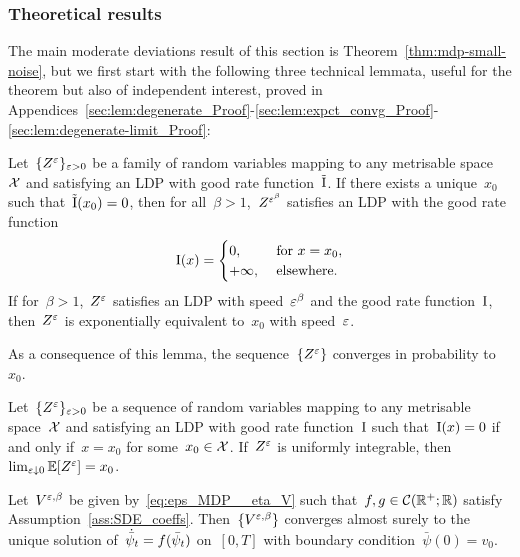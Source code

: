 \subsubsection{Theoretical results}
The main moderate deviations result of this section is Theorem~\ref{thm:mdp-small-noise}, 
but we first start with the following three technical lemmata,
useful for the theorem but also of independent interest, proved in Appendices~\ref{sec:lem:degenerate_Proof}-\ref{sec:lem:expct_convg_Proof}-\ref{sec:lem:degenerate-limit_Proof}:
\begin{lemma}\label{lem:degenerate}
Let~$\{Z^{\varepsilon}\}_{\varepsilon>0}$ be a family of random variables mapping to any metrisable space~$\mathcal{X}$ and satisfying an LDP with good rate function~$\tilde{\mathrm{I}}$.
If there exists a unique~$x_0$ such that~$\tilde{\mathrm{I}}(x_0) = 0$, 
then for all~$\beta > 1$,~$Z^{\varepsilon^\beta}$ satisfies an LDP with the good rate function
\[ 
\mathrm{I}(x)=
\begin{cases} 
      0, & \text{ for } x=x_0, \\
      +\infty, & \text{ elsewhere.}
\end{cases}
\]
If for~$\beta > 1$,~$Z^{\varepsilon}$ satisfies an LDP with speed~$\varepsilon^{\beta}$ and the good rate function~$\mathrm{I}$, then~$Z^{\varepsilon}$ is exponentially equivalent to~$x_0$ with speed~$\varepsilon$.
\end{lemma}

As a consequence of this lemma, the sequence~$\{Z^{\varepsilon}\}$ converges in probability to~$x_0$. 

\begin{lemma}\label{lem:expct_convg}
Let~$\{Z^{\varepsilon}\}_{\varepsilon>0}$ be a sequence of random variables mapping to any metrisable space~$\mathcal{X}$ and satisfying an LDP with good rate function~$\mathrm{I}$ such that~$\mathrm{I}(x)=0$ if and only if~$x = x_0$ for some~$x_0 \in\mathcal{X}$. 
If~$Z^{\varepsilon}$ is uniformly integrable, then~$\lim_{\varepsilon\downarrow 0}\mathbb{E}[Z^{\varepsilon}] = x_0$.
\end{lemma}

\begin{lemma}\label{lem:degenerate-limit}
Let~$V^{\varepsilon,\beta}$ be given by~\eqref{eq:eps_MDP__eta_V} such that~$f, g\in\mathcal{C}(\mathbb{R}^+; \mathbb{R})$  satisfy Assumption~\ref{ass:SDE_coeffs}. Then~$\{V^{\varepsilon,\beta}\}$ converges almost surely to the unique solution of~$\dot{\bar\psi}_t =\nobreak f(\bar\psi_t)$ on~$[0,T]$ with boundary condition~$\bar\psi(0) = v_0$.
\end{lemma}


